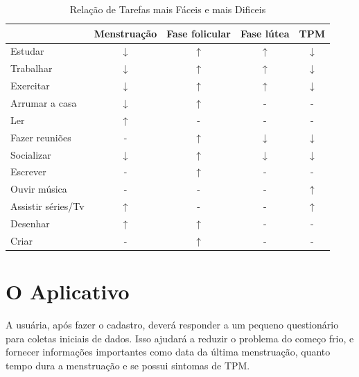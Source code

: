 \begin{table}[]
    \centering
	\caption{Relação de Tarefas mais Fáceis e mais Dificeis}
    \label{tab09}
    \begin{tabular}{|l|c|c|c|c|}
    \hline
    \rowcolor[HTML]{C0C0C0} 
    \multicolumn{1}{|c|}{\cellcolor[HTML]{C0C0C0}Tarefas recomendadas}  & Menstruação & Fase folicular  & Fase lútea & TPM \\ \hline
    Estudar & $\downarrow$  & $\uparrow$ & $\uparrow$ & $\downarrow$ \\ \hline
    \rowcolor[HTML]{EFEFEF} 
    Trabalhar & $\downarrow$ & $\uparrow$  & $\uparrow$ &  $\downarrow$  \\ \hline
    Exercitar & $\downarrow$ & $\uparrow$ & $\uparrow$ &  $\downarrow$  \\ \hline
    \rowcolor[HTML]{EFEFEF} 
    Arrumar a casa  & $\downarrow$ & $\uparrow$  & - & - \\ \hline
    Ler & $\uparrow$ & -  & - & - \\ \hline
    \rowcolor[HTML]{EFEFEF} 
    Fazer reuniões & - & $\uparrow$ & $\downarrow$ & $\downarrow$ \\ \hline
    \rowcolor[HTML]{EFEFEF} 
    Socializar & $\downarrow$ & $\uparrow$  & $\downarrow$ & $\downarrow$ \\ \hline
    \rowcolor[HTML]{EFEFEF} 
    Escrever & - & $\uparrow$  & - & - \\ \hline
    Ouvir música & - & - & - & $\uparrow$ \\ \hline
    \rowcolor[HTML]{EFEFEF} 
    Assistir séries/Tv & $\uparrow$ & - & - & $\uparrow$ \\ \hline
    Desenhar & $\uparrow$ & $\uparrow$  & - & - \\ \hline
    \rowcolor[HTML]{EFEFEF} 
    Criar & - & $\uparrow$  & - & - \\ \hline
    \end{tabular}
    \end{table}

\section{O Aplicativo}

A usuária, após fazer o cadastro, deverá responder a um pequeno 
questionário para coletas iniciais de dados. Isso ajudará a reduzir 
o problema do começo frio, e fornecer informações importantes 
como data da última menstruação, quanto tempo dura a menstruação 
e se possui sintomas de TPM.

